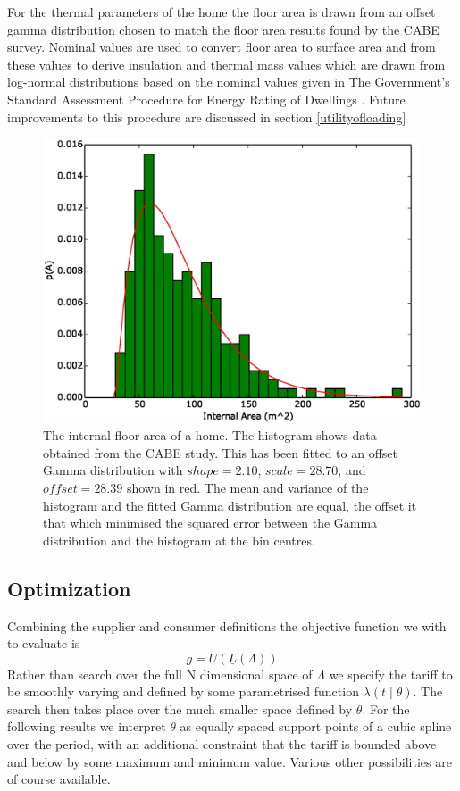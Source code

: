 \documentclass[a4paper, 10 pt, conference]{ieeeconf}  %
\begin{document}
For the thermal parameters of the home the floor area is drawn from an offset gamma distribution chosen to match the floor area results found by the CABE survey. Nominal values are used to convert floor area to surface area and from these values to derive insulation and thermal mass values which are drawn from log-normal distributions based on the nominal values given in The Government’s Standard Assessment Procedure for Energy Rating of Dwellings \cite{SAP}. Future improvements to this procedure are discussed in section \ref{utilityofloading}

\begin{figure}[htb]
\centering
\includegraphics[width=\columnwidth,trim =0cm 0cm 0cm 0cm,clip=True]{f3.eps}
\caption{The internal floor area of a home. The histogram shows data obtained from the CABE study. This has been fitted to an offset Gamma distribution with $shape=2.10$, $scale=28.70$, and $ offset=28.39$ shown in red. The mean and variance of the histogram and the fitted Gamma distribution are equal, the offset it that which minimised the squared error between the Gamma distribution and the histogram at the bin centres.}
\label{GIA}
\end{figure}

\subsection{Optimization}
Combining the supplier and consumer definitions the objective function we with to evaluate is
\begin{equation}
g = U(\underline{L}(\Lambda))
\end{equation}
Rather than search over the full N dimensional space of $\Lambda$ we specify the tariff to be smoothly varying and defined by some parametrised function $\lambda(t \mid \theta)$. The search then takes place over the much smaller space defined by $\theta$. For the following results we interpret $\theta$ as equally spaced support points of a cubic spline over the period, with an additional constraint that the tariff is bounded above and below by some maximum and minimum value. Various other possibilities are of course available.
\end{document}
